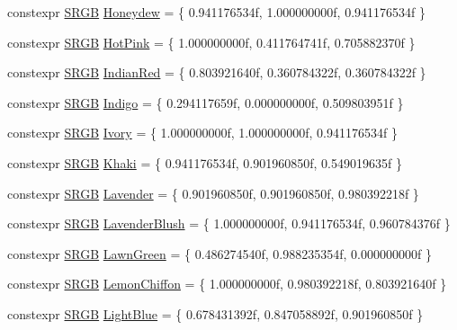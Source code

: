 \begin{DoxyCompactItemize}
\item 
constexpr \hyperlink{structmage_1_1_s_r_g_b}{S\+R\+GB} \hyperlink{namespacemage_1_1color_ac2cf218282d11f2f3aaee6fa78af6038}{Honeydew} = \{ 0.\+941176534f, 1.\+000000000f, 0.\+941176534f \}
\item 
constexpr \hyperlink{structmage_1_1_s_r_g_b}{S\+R\+GB} \hyperlink{namespacemage_1_1color_aff420f4fdc84fc819656c7b942d4a976}{Hot\+Pink} = \{ 1.\+000000000f, 0.\+411764741f, 0.\+705882370f \}
\item 
constexpr \hyperlink{structmage_1_1_s_r_g_b}{S\+R\+GB} \hyperlink{namespacemage_1_1color_a45104ede72483cb45b94b9a39f3b47cd}{Indian\+Red} = \{ 0.\+803921640f, 0.\+360784322f, 0.\+360784322f \}
\item 
constexpr \hyperlink{structmage_1_1_s_r_g_b}{S\+R\+GB} \hyperlink{namespacemage_1_1color_ab31bd205544fcfb991bb62fb776bf7a6}{Indigo} = \{ 0.\+294117659f, 0.\+000000000f, 0.\+509803951f \}
\item 
constexpr \hyperlink{structmage_1_1_s_r_g_b}{S\+R\+GB} \hyperlink{namespacemage_1_1color_ae72c29cc5e109df4819ae907117f0452}{Ivory} = \{ 1.\+000000000f, 1.\+000000000f, 0.\+941176534f \}
\item 
constexpr \hyperlink{structmage_1_1_s_r_g_b}{S\+R\+GB} \hyperlink{namespacemage_1_1color_a8fd56f3645199058ed807390858c1fb4}{Khaki} = \{ 0.\+941176534f, 0.\+901960850f, 0.\+549019635f \}
\item 
constexpr \hyperlink{structmage_1_1_s_r_g_b}{S\+R\+GB} \hyperlink{namespacemage_1_1color_a5f6b29a4707a0d3f33ee6b27b5c44d73}{Lavender} = \{ 0.\+901960850f, 0.\+901960850f, 0.\+980392218f \}
\item 
constexpr \hyperlink{structmage_1_1_s_r_g_b}{S\+R\+GB} \hyperlink{namespacemage_1_1color_a90a4b5ea124bee04590c85bfdd9c2e35}{Lavender\+Blush} = \{ 1.\+000000000f, 0.\+941176534f, 0.\+960784376f \}
\item 
constexpr \hyperlink{structmage_1_1_s_r_g_b}{S\+R\+GB} \hyperlink{namespacemage_1_1color_a0bb99b63d697eb437075b3ec801288dc}{Lawn\+Green} = \{ 0.\+486274540f, 0.\+988235354f, 0.\+000000000f \}
\item 
constexpr \hyperlink{structmage_1_1_s_r_g_b}{S\+R\+GB} \hyperlink{namespacemage_1_1color_a74c87d2cae011f5cb6da406693bef936}{Lemon\+Chiffon} = \{ 1.\+000000000f, 0.\+980392218f, 0.\+803921640f \}
\item 
constexpr \hyperlink{structmage_1_1_s_r_g_b}{S\+R\+GB} \hyperlink{namespacemage_1_1color_acd9eefb90a39e16c44165719acfae942}{Light\+Blue} = \{ 0.\+678431392f, 0.\+847058892f, 0.\+901960850f \}

\end{DoxyCompactItemize}
